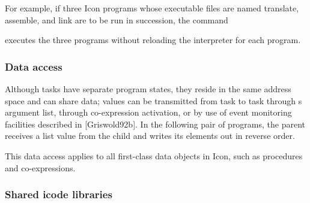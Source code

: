 
For example, if three Icon programs whose executable files are named
translate, assemble, and link are to be run in succession, the command 


\noindent
executes the three programs without reloading the interpreter for each
program. 

\subsubsection{Data access}

Although tasks have separate program states, they reside in the same
address space and can share data; values can be transmitted from task
to task through
s argument list,
through co-expression activation, or by use of event monitoring
facilities described in [Griswold92b]. In the following pair of
programs, the parent receives a list value from the child and writes
its elements out in reverse order. 


This data access applies to all first-class data objects in Icon, such
as procedures and co-expressions. 

\subsubsection{Shared icode libraries}

